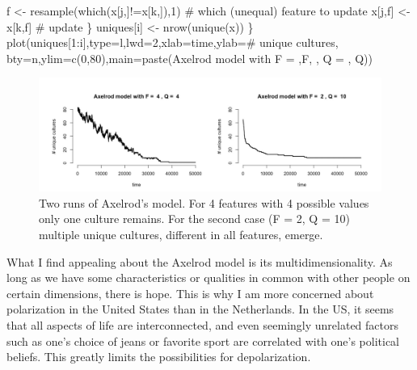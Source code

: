 \documentclass[
  letterpaper,
]{scrbook}
\newenvironment{Shaded}{\begin{snugshade}}{\end{snugshade}}
\newcommand{\AttributeTok}[1]{\textcolor[rgb]{0.40,0.45,0.13}{#1}}
\newcommand{\CommentTok}[1]{\textcolor[rgb]{0.37,0.37,0.37}{#1}}
\newcommand{\DecValTok}[1]{\textcolor[rgb]{0.68,0.00,0.00}{#1}}
\newcommand{\FunctionTok}[1]{\textcolor[rgb]{0.28,0.35,0.67}{#1}}
\newcommand{\NormalTok}[1]{\textcolor[rgb]{0.00,0.23,0.31}{#1}}
\newcommand{\OtherTok}[1]{\textcolor[rgb]{0.00,0.23,0.31}{#1}}
\newcommand{\SpecialCharTok}[1]{\textcolor[rgb]{0.37,0.37,0.37}{#1}}
\newcommand{\StringTok}[1]{\textcolor[rgb]{0.13,0.47,0.30}{#1}}
\begin{document}
\begin{Shaded}
\begin{Highlighting}[]
\NormalTok{    f }\OtherTok{\textless{}{-}} \FunctionTok{resample}\NormalTok{(}\FunctionTok{which}\NormalTok{(x[j,]}\SpecialCharTok{!=}\NormalTok{x[k,]),}\DecValTok{1}\NormalTok{) }\CommentTok{\# which (unequal) feature to update}
\NormalTok{    x[j,f] }\OtherTok{\textless{}{-}}\NormalTok{ x[k,f] }\CommentTok{\# update}
\NormalTok{    \}}
\NormalTok{  uniques[i] }\OtherTok{\textless{}{-}} \FunctionTok{nrow}\NormalTok{(}\FunctionTok{unique}\NormalTok{(x))}
\NormalTok{\}}
\FunctionTok{plot}\NormalTok{(uniques[}\DecValTok{1}\SpecialCharTok{:}\NormalTok{i],}\AttributeTok{type=}\StringTok{\textquotesingle{}l\textquotesingle{}}\NormalTok{,}\AttributeTok{lwd=}\DecValTok{2}\NormalTok{,}\AttributeTok{xlab=}\StringTok{\textquotesingle{}time\textquotesingle{}}\NormalTok{,}\AttributeTok{ylab=}\StringTok{\textquotesingle{}\# unique cultures\textquotesingle{}}\NormalTok{,}
     \AttributeTok{bty=}\StringTok{\textquotesingle{}n\textquotesingle{}}\NormalTok{,}\AttributeTok{ylim=}\FunctionTok{c}\NormalTok{(}\DecValTok{0}\NormalTok{,}\DecValTok{80}\NormalTok{),}\AttributeTok{main=}\FunctionTok{paste}\NormalTok{(}\StringTok{\textquotesingle{}Axelrod model with F = \textquotesingle{}}\NormalTok{,F, }\StringTok{\textquotesingle{}, Q = \textquotesingle{}}\NormalTok{, Q))}
\end{Highlighting}
\end{Shaded}

\begin{figure}

{\centering \includegraphics[width=6.26389in,height=\textheight]{media/ch7/image4.jpg}

}

\caption{\label{fig-ch7-img4-old-92}Two runs of Axelrod's model. For 4
features with 4 possible values only one culture remains. For the second
case (F = 2, Q = 10) multiple unique cultures, different in all
features, emerge.}

\end{figure}

What I find appealing about the Axelrod model is its
multidimensionality. As long as we have some characteristics or
qualities in common with other people on certain dimensions, there is
hope. This is why I am more concerned about polarization in the United
States than in the Netherlands. In the US, it seems that all aspects of
life are interconnected, and even seemingly unrelated factors such as
one's choice of jeans or favorite sport are correlated with one's
political beliefs. This greatly limits the possibilities for
depolarization.
\end{document}
